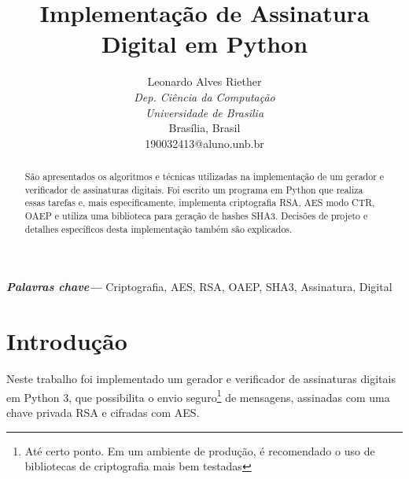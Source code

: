 \documentclass[a4paper, 10.5pt]{article}
\begin{document}
\providecommand{\keywords}[1]
{
  \small	
  \textbf{\textit{Palavras chave---}} #1
}

\title{Implementação de Assinatura Digital em Python}

\author{Leonardo Alves Riether \\
    \textit{Dep. Ciência da Computação} \\
    \textit{Universidade de Brasilia}\\
    Brasília, Brasil \\
    190032413@aluno.unb.br
}

\maketitle


\begin{abstract}
    São apresentados os algoritmos e técnicas utilizadas na implementação de um
    gerador e verificador de assinaturas digitais. Foi escrito um programa em
    Python que realiza essas tarefas e, mais especificamente, implementa
    criptografia RSA, AES modo CTR, OAEP e utiliza uma biblioteca para geração
    de hashes SHA3. Decisões de projeto e detalhes específicos desta
    implementação também são explicados.

\end{abstract}

\keywords{Criptografia, AES, RSA, OAEP, SHA3, Assinatura, Digital}


\section{Introdução} %
\label{sec:visao-geral}
    Neste trabalho foi implementado um gerador e verificador de assinaturas
    digitais em Python 3, que possibilita o envio seguro\footnote{Até certo
    ponto. Em um ambiente de produção, é recomendado o uso de bibliotecas de
criptografia mais bem testadas} de mensagens, assinadas com uma chave privada
RSA e cifradas com AES.
\end{document}
